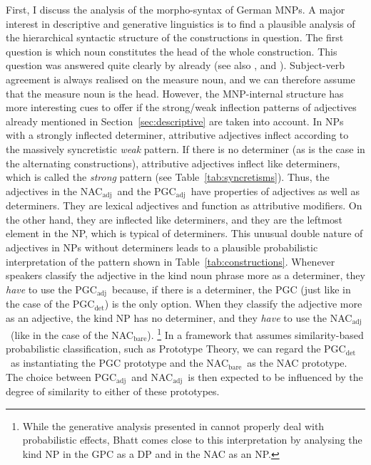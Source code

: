 \documentclass[USenglish]{article}
\newcommand{\Sub}[1]{\ensuremath{\mathrm{_{#1}}}}
\newcommand{\NACb}{NAC\Sub{bare}}
\newcommand{\NACa}{NAC\Sub{adj}}
\newcommand{\PGCd}{PGC\Sub{det}}
\newcommand{\PGCa}{PGC\Sub{adj}}
\begin{document}
First, I discuss the analysis of the morpho-syntax of German MNPs.
A major interest in descriptive and generative linguistics is to find a plausible analysis of the hierarchical syntactic structure of the constructions in question.
The first question is which noun constitutes the head of the whole construction.
This question was answered quite clearly by \cite{Loebel1986} already (see also \citealp[213]{Eschenbach1994}, and \citealp[16]{GallmannLindauer1994}).
Subject-verb agreement is always realised on the measure noun, and we can therefore assume that the measure noun is the head.
However, the MNP-internal structure has more interesting cues to offer if the strong\slash weak inflection patterns of adjectives already mentioned in Section~\ref{sec:descriptive} are taken into account.
In NPs with a strongly inflected determiner, attributive adjectives inflect according to the massively syncretistic \textit{weak} pattern.
If there is no determiner (as is the case in the alternating constructions), attributive adjectives inflect like determiners, which is called the \textit{strong} pattern (see Table~\ref{tab:syncretisms}).
Thus, the adjectives in the \NACa\ and the \PGCa\ have properties of adjectives as well as determiners.
They are lexical adjectives and function as attributive modifiers.
On the other hand, they are inflected like determiners, and they are the leftmost element in the NP, which is typical of determiners.
This unusual double nature of adjectives in NPs without determiners leads to a plausible probabilistic interpretation of the pattern shown in Table~\ref{tab:constructions}.
Whenever speakers classify the adjective in the kind noun phrase more as a determiner, they \textit{have} to use the \PGCa\ because, if there is a determiner, the PGC (just like in the case of the \PGCd) is the only option.
When they classify the adjective more as an adjective, the kind NP has no determiner, and they \textit{have} to use the \NACa\ (like in the case of the \NACb).%
\footnote{While the generative analysis presented in \cite{Bhatt1990} cannot properly deal with probabilistic effects, Bhatt comes close to this interpretation by analysing the kind NP in the GPC as a DP and in the NAC as an NP.}
In a framework that assumes similarity-based probabilistic classification, such as Prototype Theory, we can regard the \PGCd\ as instantiating the PGC prototype and the \NACb\ as the NAC prototype.
The choice between \PGCa\ and \NACa\ is then expected to be influenced by the degree of similarity to either of these prototypes.
\end{document}
